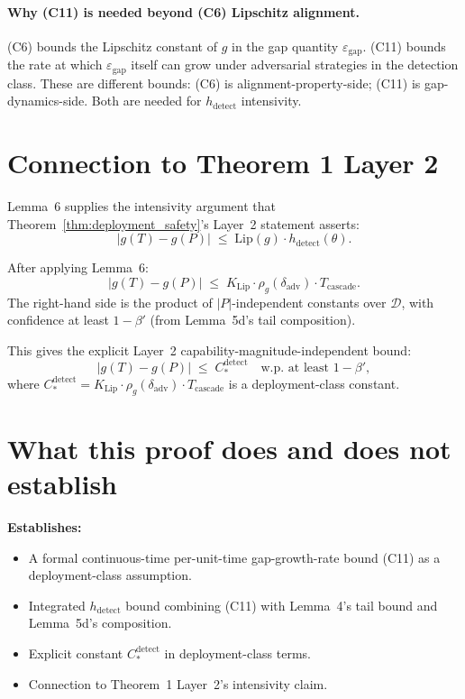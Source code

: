 \documentclass{article}
\newcommand{\deltaadv}{\delta_{\mathrm{adv}}}
\newcommand{\Pproxy}{P}
\newcommand{\Ttruth}{T}
\newcommand{\epsgap}{\varepsilon_{\mathrm{gap}}}
\begin{document}
\paragraph{Why (C11) is needed beyond (C6) Lipschitz alignment.}
(C6) bounds the Lipschitz constant of $g$ in the gap quantity
$\epsgap$.  (C11) bounds the rate at which $\epsgap$ itself can
grow under adversarial strategies in the detection class.  These
are different bounds: (C6) is alignment-property-side; (C11) is
gap-dynamics-side.  Both are needed for $h_{\mathrm{detect}}$
intensivity.

\section{Connection to Theorem 1 Layer 2}

Lemma~6 supplies the intensivity argument that
Theorem~\ref{thm:deployment_safety}'s Layer~2 statement asserts:
\[
  |g(\Ttruth) - g(\Pproxy)| \;\leq\; \mathrm{Lip}(g) \cdot
  h_{\mathrm{detect}}(\theta).
\]

After applying Lemma~6:
\[
  |g(\Ttruth) - g(\Pproxy)| \;\leq\; K_{\mathrm{Lip}} \cdot
  \rho_g(\deltaadv) \cdot T_{\mathrm{cascade}}.
\]
The right-hand side is the product of $|P|$-independent constants
over $\mathcal{D}$, with confidence at least $1 - \beta'$
(from Lemma~5d's tail composition).

This gives the explicit Layer~2 capability-magnitude-independent
bound:
\[
  |g(\Ttruth) - g(\Pproxy)| \;\leq\; C^{\mathrm{detect}}_*
  \quad \text{w.p. at least } 1 - \beta',
\]
where $C^{\mathrm{detect}}_* = K_{\mathrm{Lip}} \cdot
\rho_g(\deltaadv) \cdot T_{\mathrm{cascade}}$ is a deployment-class
constant.

\section{What this proof does and does not establish}

\textbf{Establishes:}
\begin{itemize}
\item A formal continuous-time per-unit-time gap-growth-rate bound
  (C11) as a deployment-class assumption.
\item Integrated $h_{\mathrm{detect}}$ bound combining (C11) with
  Lemma~4's tail bound and Lemma~5d's composition.
\item Explicit constant $C^{\mathrm{detect}}_*$ in deployment-class
  terms.
\item Connection to Theorem~1 Layer~2's intensivity claim.
\end{itemize}
\end{document}
